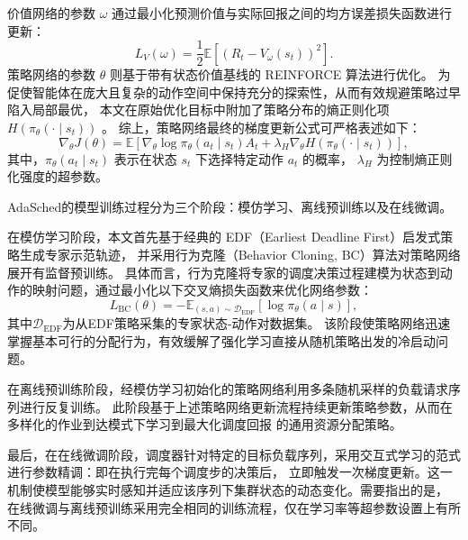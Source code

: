 价值网络的参数 $\omega$ 通过最小化预测价值与实际回报之间的均方误差损失函数进行更新：
\begin{equation}\label{eq:critic-loss}
  L_V\left(\omega\right) = \frac{1}{2} \mathbb{E}\left[ \left(R_t - V_\omega\left(s_t\right)\right)^2 \right].
\end{equation}
策略网络的参数 $\theta$ 则基于带有状态价值基线的 REINFORCE 算法进行优化。
为促使智能体在庞大且复杂的动作空间中保持充分的探索性，从而有效规避策略过早陷入局部最优，
本文在原始优化目标中附加了策略分布的熵正则化项 $H\left(\pi_\theta\left(\cdot \mid s_t\right)\right)$ 。
综上，策略网络最终的梯度更新公式可严格表述如下：
\begin{equation}\label{eq:actor-update}
  \nabla_\theta J\left(\theta\right) = \mathbb{E}\left[ \nabla_\theta \log \pi_\theta\left(a_t \mid s_t\right) A_t + \lambda_H \nabla_\theta H\left(\pi_\theta\left(\cdot \mid s_t\right)\right) \right],
\end{equation}
其中，$\pi_\theta\left(a_t \mid s_t\right)$ 表示在状态 $s_t$ 下选择特定动作 $a_t$ 的概率，
$\lambda_H$ 为控制熵正则化强度的超参数。

AdaSched的模型训练过程分为三个阶段：模仿学习、离线预训练以及在线微调。

在模仿学习阶段，本文首先基于经典的 EDF（Earliest Deadline First）启发式策略生成专家示范轨迹，
并采用行为克隆（Behavior Cloning, BC）算法对策略网络展开有监督预训练。
具体而言，行为克隆将专家的调度决策过程建模为状态到动作的映射问题，通过最小化以下交叉熵损失函数来优化网络参数：
\begin{equation}\label{eq:bc-loss}
  L_{\mathrm{BC}}\left(\theta\right) = -\mathbb{E}_{\left(s,a\right)\sim\mathcal{D}_{\mathrm{EDF}}}\left[\log \pi_\theta\left(a \mid s\right)\right],
\end{equation}
其中$\mathcal{D}_{\mathrm{EDF}}$为从EDF策略采集的专家状态-动作对数据集。
该阶段使策略网络迅速掌握基本可行的分配行为，有效缓解了强化学习直接从随机策略出发的冷启动问题。

在离线预训练阶段，经模仿学习初始化的策略网络利用多条随机采样的负载请求序列进行反复训练。
此阶段基于上述策略网络更新流程持续更新策略参数，从而在多样化的作业到达模式下学习到最大化调度回报
的通用资源分配策略。

最后，在在线微调阶段，调度器针对特定的目标负载序列，采用交互式学习的范式进行参数精调：即在执行完每个调度步的决策后，
立即触发一次梯度更新。这一机制使模型能够实时感知并适应该序列下集群状态的动态变化。需要指出的是，
在线微调与离线预训练采用完全相同的训练流程，仅在学习率等超参数设置上有所不同。

